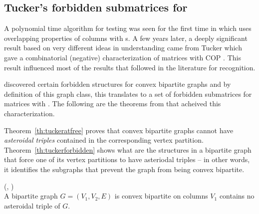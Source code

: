 \subsection{Tucker's forbidden submatrices for \COP}

A polynomial time algorithm for \COP testing was seen for the first
time in \cite{fg65} which uses overlapping properties of columns with
\un s. A few years later, a deeply significant result based on very
different ideas in understanding \COP came from Tucker which gave a
combinatorial (negative) characterization of matrices with COP
\cite{at72}. This result influenced most of the \COP results that
followed in the literature  for \COP recognition.

\cite{at72} discovered certain forbidden structures for convex
bipartite graphs and by definition of this graph
class, this translates to a set of forbidden submatrices for matrices
with \cop.  The following are the theorems from \cite{at72} that
acheived this characterization.


Theorem~\ref{th:tuckeratfree} proves that convex bipartite graphs
cannot have {\em asteroidal triples} contained in the corresponding vertex
partition.
Theorem~\ref{th:tuckerforbidden} shows what are the structures in a
bipartite graph that force one of its vertex partitions to have
asteriodal triples -- in other words, it identifies the subgraphs that
prevent the graph from being convex bipartite.


\begin{theorem}
  (\cite[Th.~6]{at72}, \cite[Th.~2.3]{d08phd})\\
  A bipartite graph $G = (V_1, V_2, E)$ is convex bipartite on
  columns \iff $V_1$ contains no asteroidal
  triple of $G$.
  \label{th:tuckeratfree}
\end{theorem}

